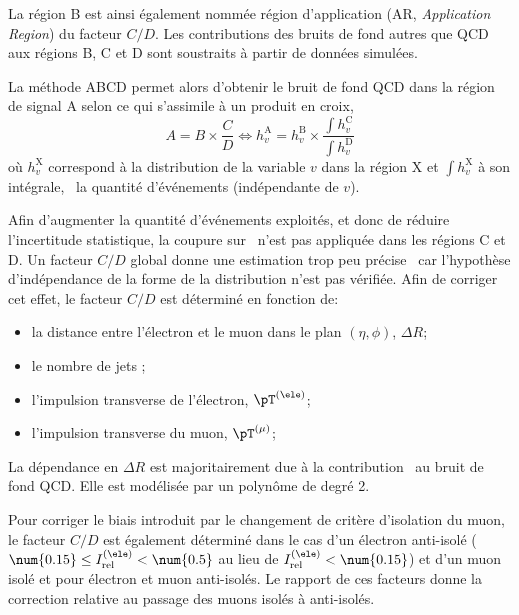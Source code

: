 La région B est ainsi également nommée région d'application (AR, \emph{Application Region}) du facteur $C/D$.
Les contributions des bruits de fond autres que QCD aux régions B, C et D sont soustraits à partir de données simulées.
\par
La méthode ABCD permet alors d'obtenir le bruit de fond QCD dans la région de signal A selon ce qui s'assimile à un produit en croix,
\begin{equation}
A = B \times \frac{C}{D} \Leftrightarrow h_v^\text{A} = h_v^\text{B} \times \frac{\int h_v^\text{C}}{\int h_v^\text{D}}
\end{equation}
où $h_v^\text{X}$ correspond à la distribution de la variable $v$ dans la région X et $\int h_v^\text{X}$ à son intégrale, \ie\ la quantité d'événements (indépendante de $v$).
\par
Afin d'augmenter la quantité d'événements exploités, et donc de réduire l'incertitude statistique, la coupure sur \Dzeta\ n'est pas appliquée dans les régions C et D.
Un facteur $C/D$ global donne une estimation trop peu précise~\cite{CMS-PAS-HIG-18-032} car l'hypothèse d'indépendance de la forme de la distribution n'est pas vérifiée.
Afin de corriger cet effet, le facteur $C/D$ est déterminé en fonction de:
\begin{itemize}
\item la distance entre l'électron et le muon dans le plan $(\eta,\phi)$, $\Delta R$;
\item le nombre de jets \Njets;
\item l'impulsion transverse de l'électron, $\pT^{(\ele)}$;
\item l'impulsion transverse du muon, $\pT^{(\mu)}$;
\end{itemize}
La dépendance en $\Delta R$ est majoritairement due à la contribution \quarkb\antiquarkb\ au bruit de fond QCD.
Elle est modélisée par un polynôme de degré 2.
\par
Pour corriger le biais introduit par le changement de critère d'isolation du muon, le facteur $C/D$ est également déterminé dans le cas d'un électron anti-isolé ($\num{0.15}\leq I_\text{rel}^{(\ele)} < \num{0.5}$ au lieu de $I_\text{rel}^{(\ele)} < \num{0.15}$) et d'un muon isolé et pour électron et muon anti-isolés.
Le rapport de ces facteurs donne la correction relative au passage des muons isolés à anti-isolés.
